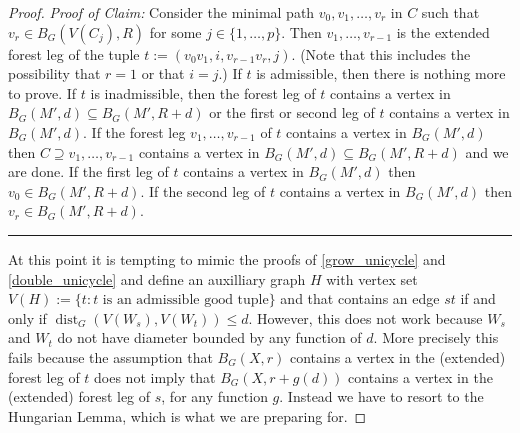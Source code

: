 \documentclass{patmorin}
\newenvironment{clmproof}{\noindent\emph{Proof of Claim:}}{\hfill\rule{1ex}{1ex}\newline}
\DeclareMathOperator{\dist}{dist}
\begin{document}
\begin{proof}
\begin{clmproof}
  Consider the minimal path $v_0,v_1,\ldots,v_r$ in $C$ such that $v_r\in B_G(V(C_j),R)$ for some $j\in\{1,\ldots,p\}$.  Then $v_1,\ldots,v_{r-1}$ is the extended forest leg of the tuple $t:=(v_0v_1,i,v_{r-1}v_r,j)$. (Note that this includes the possibility that $r=1$ or that $i=j$.)  If $t$ is admissible, then there is nothing more to prove.  If $t$ is inadmissible, then the forest leg of $t$ contains a vertex in $B_G(M',d)\subseteq B_G(M',R+d)$ or the first or second leg of $t$ contains a vertex in $B_G(M',d)$.  If the forest leg $v_1,\ldots,v_{r-1}$ of $t$ contains a vertex in $B_G(M',d)$ then $C\supseteq v_1,\ldots,v_{r-1}$ contains a vertex in $B_G(M',d)\subseteq B_G(M',R+d)$ and we are done.  If the first leg of $t$ contains a vertex in $B_G(M',d)$ then $v_0\in B_G(M',R+d)$.  If the second leg of $t$ contains a vertex in $B_G(M',d)$ then $v_r\in B_G(M',R+d)$.
\end{clmproof}

At this point it is tempting to mimic the proofs of \cref{grow_unicycle} and \cref{double_unicycle} and define an auxilliary graph $H$ with vertex set $V(H):=\{t:\textrm{$t$ is an admissible good tuple}\}$ and that contains an edge $st$ if and only if $\dist_G(V(W_s),V(W_t))\le d$. However, this does not work because $W_s$ and $W_t$ do not have diameter bounded by any function of $d$.  More precisely this fails because the assumption that $B_G(X,r)$ contains a vertex in the (extended) forest leg of $t$ does not imply that $B_G(X,r+g(d))$ contains a vertex in the (extended) forest leg of $s$, for any function $g$.  Instead we have to resort to the Hungarian Lemma, which is what we are preparing for.








\end{proof}
\end{document}
